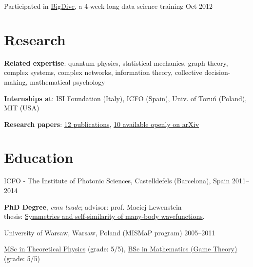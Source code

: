 \documentclass[margin,line]{resume}
\begin{document}
\begin{resume}
\begin{list2}
    \item Participated in \href{http://bigdive.eu}{BigDive}, a 4-week long data science training \hfill { Oct 2012}

    \end{list2}

    \section{\mysidestyle Research}

    \begin{list2}

    \item {\bf Related expertise}: quantum physics, statistical mechanics, graph theory, complex systems, complex networks, information theory, collective decision-making, mathematical psychology

    \item {\bf Internships at}: ISI Foundation (Italy), ICFO (Spain), Univ. of Toruń (Poland), MIT (USA)

    \item {\bf Research papers}: \href{http://scholar.google.com/citations?user=JUwBsPAAAAAJ&hl=en}{12 publications}, \href{http://arxiv.org/a/migdal\_p\_1}{10 available openly on arXiv}

    \end{list2}


    \section{\mysidestyle Education}

    ICFO - The Institute of Photonic Sciences,  Castelldefels (Barcelona), Spain \hfill { 2011--2014}\\
   \begin{list2}
        \vspace*{-4mm}
        \item \textbf{PhD Degree}, \emph{cum laude}; advisor: prof. Maciej Lewenstein\\
            thesis: \href{http://arxiv.org/abs/1412.6796}{Symmetries and self-similarity of many-body wavefunctions}.
    \end{list2}
    \vspace*{-4mm}
    University of Warsaw, Warsaw, Poland (MISMaP program) \hfill { 2005--2011}\\
    \begin{list2}
      \vspace*{-4mm}
      \item \href{http://migdal.wikidot.com/en:collective-decoherence}{MSc in Theoretical Physics} (grade: 5/5),
      \href{http://migdal.wikidot.com/en:mafia}{BSc in Mathematics (Game Theory)} (grade: 5/5)
    \end{list2}


\end{resume}
\end{document}
